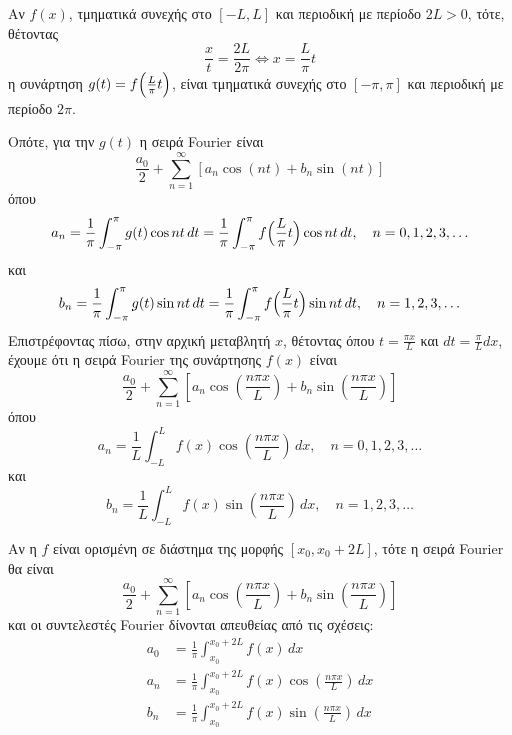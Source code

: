   \begin{rem}
    Αν $ f(x) $, τμηματικά συνεχής στο $ [-L, L] $ και περιοδική  με περίοδο 
    $ 2L>0 $, τότε, θέτοντας 
    \[ 
      \frac{x}{t} = \frac{2L}{2 \pi} \Leftrightarrow \boxed{x= \frac{L}{\pi} t}
    \]
    η συνάρτηση $ g(t) = f\Bigl(\frac{L}{\pi}t\Bigr) $, είναι τμηματικά συνεχής στο 
    $ [- \pi , \pi] $ και περιοδική με περίοδο $ 2 \pi $.
  \end{rem}
  Οπότε, για την $ g(t) $ η σειρά Fourier είναι 
  \[
    \frac{a_{0}}{2} + \sum_{n=1}^{\infty} [a_{n} \cos{(nt)} + b_{n} \sin{(nt)}]
  \] 
  όπου 
  \[
    a_{n} = \frac{1}{\pi} \int _{- \pi}^{\pi} g(t) \cos{nt} \,{dt} = 
    \frac{1}{\pi} \int _{- \pi}^{\pi} f\Bigl(\frac{L}{\pi} t\Bigr) \cos{nt} \,{dt}, 
    \quad n = 0,1,2,3, \ldots
  \] 
  και 
  \[
    b_{n} = \frac{1}{\pi} \int _{- \pi}^{\pi} g(t) \sin{nt} \,{dt} = 
    \frac{1}{\pi} \int _{- \pi}^{\pi} f\Bigl(\frac{L}{\pi} t\Bigr) \sin{nt} \,{dt}, 
    \quad n = 1,2,3, \ldots
  \]
  Επιστρέφοντας πίσω, στην αρχική μεταβλητή $x$, θέτοντας όπου $ t = \frac{\pi x}{L} $ 
  και $ dt = \frac{\pi}{L} dx $, έχουμε ότι η σειρά Fourier της συνάρτησης $ f(x) $ είναι
  \[
    \boxed{\frac{a_{0}}{2} + \sum_{n=1}^{\infty} \left[a_{n} 
        \cos{\left(\frac{n \pi x}{L}\right)} + b_{n} 
    \sin{\left(\frac{n \pi x}{L}\right)} \right]}
  \]
  όπου 
  \[
    a_{n} = \frac{1}{L} \int _{- L}^{L} f(x) 
    \cos{\left(\frac{n \pi x}{L}\right)} \,{dx}, \quad n = 0,1,2,3, \ldots
  \] 
  και 
  \[
    b_{n} = \frac{1}{L} \int _{- L}^{L} f(x) 
    \sin{\left(\frac{n \pi x}{L}\right)} \,{dx}, \quad n = 1,2,3, \ldots
  \]

  \begin{rem}
    Αν η $f$ είναι ορισμένη σε διάστημα της μορφής $ [x_{0}, x_{0}+2L] $, 
    τότε η σειρά Fourier θα είναι 
    \[
      \frac{a_{0}}{2} + \sum_{n=1}^{\infty} \left[a_{n} 
        \cos{\left(\frac{n \pi x}{L}\right)} + b_{n} 
      \sin{\left(\frac{n \pi x}{L}\right)} \right]
    \]
    και οι συντελεστές Fourier δίνονται απευθείας από τις σχέσεις:
    \begin{align*}
      a_{0} &= \frac{1}{\pi} \int _{x_{0}}^{x_{0}+ 2 L}f(x) \,{dx} \\
      a_{n} &= \frac{1}{\pi} \int _{x_{0}}^{x_{0}+ 2 L} f(x) \cos{\left(\frac{n \pi x}{L}\right)} \,{dx}  \\
      b_{n} &= \frac{1}{\pi} \int _{x_{0}}^{x_{0}+ 2 L} f(x) \sin{\left(\frac{n \pi x}{L}\right)} \,{dx}  
    \end{align*} 
  \end{rem}

